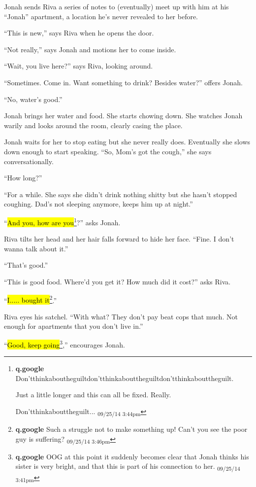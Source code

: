 Jonah sends Riva a series of notes to (eventually) meet up with him at his ``Jonah'' apartment, a location he's never revealed to her before.

``This is new,'' says Riva when he opens the door.

``Not really,'' says Jonah and motions her to come inside.

``Wait, you live here?'' says Riva, looking around.

``Sometimes.  Come in.  Want something to drink?  Besides water?'' offers Jonah.

``No, water's good.''

Jonah brings her water and food.  She starts chowing down. She watches Jonah warily and looks around the room, clearly casing the place.

Jonah waits for her to stop eating but she never really does.  Eventually she slows down enough to start speaking.  ``So, Mom's got the cough,'' she says conversationally.

``How long?''

``For a while.  She says she didn't drink nothing shitty but she hasn't stopped coughing.  Dad's not sleeping anymore, keeps him up at night.''

``\hl{And you, how are you}\footnote{\textbf{q.google }Don'tthinkaboutheguiltdon'tthinkabouttheguiltdon'tthinkabouttheguilt.

Just a little longer and this can all be fixed. Really.

Don'tthinkabouttheguilt... \textsubscript{09/25/14 3:44pm}}?'' asks Jonah.

Riva tilts her head and her hair falls forward to hide her face.  ``Fine.  I don't wanna talk about it.''

``That's good.''

``This is good food. Where'd you get it?  How much did it cost?'' asks Riva.

``\hl{I..... bought it}\footnote{\textbf{q.google }Such a struggle not to make something up!  Can't you see the poor guy is suffering? \textsubscript{09/25/14 3:46pm}}.''

Riva eyes his satchel. ``With what?  They don't pay beat cops that much.  Not enough for apartments that you don't live in.''

``\hl{Good, keep going}\footnote{\textbf{q.google }OOG at this point it suddenly becomes clear that Jonah thinks his sister is very bright, and that this is part of his connection to her. \textsubscript{09/25/14 3:41pm}},'' encourages Jonah.

